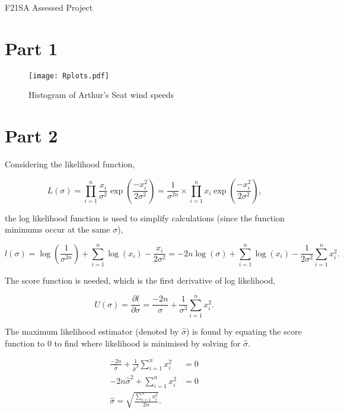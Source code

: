 \documentclass[11pt]{article}
\begin{document}
\begin{center}
    \Large{F21SA Assessed Project}
\end{center}

\section*{Part 1}

\begin{figure}[ht]
    \centering
	\texttt{[image: Rplots.pdf]}
    \caption{Histogram of Arthur's Seat wind speeds}
    \label{fig:histogram}
\end{figure}

\section*{Part 2}

Considering the likelihood function,

$$
    L(\sigma) = \prod_{i=1}^n{ \frac{x_i}{\sigma^2} \exp\left( \frac{-x_i^2}{2 \sigma^2} \right)}
    = \frac{1}{\sigma^{2n}} \times \prod_{i=1}^n{ x_i \exp\left( \frac{-x_i^2}{2 \sigma^2} \right)} \text{,}
$$

the log likelihood function is used to simplify calculations (since the function minimums occur at the same $\sigma$),

$$
    l(\sigma) = \log\left(\frac{1}{\sigma^{2n}}\right) + \sum_{i=1}^n{ \log(x_i) - \frac{x_i}{2 \sigma^2} }
    = -2n \log(\sigma) + \sum_{i=1}^n{\log(x_i)} - \frac{1}{2 \sigma^2} \sum_{i=1}^n{x_i^2} \text{.}
$$

The score function is needed, which is the first derivative of log likelihood,

$$
    U(\sigma) = \frac{\partial l}{\partial \sigma} = \frac{-2n}{\sigma} + \frac{1}{\sigma^3} \sum_{i=1}^n{x_i^2} \text{.}
$$

The maximum likelihood estimator (denoted by $ \hat\sigma $) is found by equating the score function to 0 to find where likelihood is minimised
by solving for $ \hat\sigma $.

\begin{align*}
    \frac{-2n}{\hat{\sigma}} + \frac{1}{\hat{\sigma}^3} \sum_{i=1}^n{x_i^2} &= 0 \\
    -2n \hat\sigma^2 + \sum_{i=1}^n{x_i^2} &= 0 \\
    \hat\sigma = \sqrt{\frac{\sum_{i=1}^n{x_i^2}}{2n}} \text{.}
\end{align*}
\end{document}
